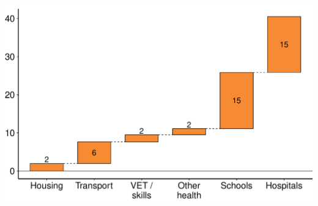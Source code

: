 \documentclass[a4paper,landscape]{article}\usepackage[]{graphicx}\usepackage[]{color}
\newenvironment{knitrout}{}{} %
\begin{document}
\begin{knitrout}
\color{fgcolor}
\includegraphics[width=11.000in,height=7.00in]{figure/GST-Figure-10-1} 


\end{knitrout}
\end{document}
